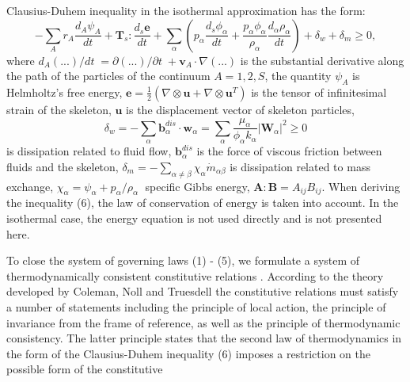 \documentclass[article,authoryear,jpm]{beg_39}             %
\begin{document}
Clausius-Duhem inequality in the isothermal approximation has the form:
\begin{equation}
-\sum\limits_{A}{{{r}_{A}}\frac{{{d}_{A}}{{\psi }_{A}}}{dt}}+{{\mathbf{T}}_{s}}:\frac{{{d}_{s}}\mathbf{e}}{dt}+\sum\limits_{\alpha }{\left( {{p}_{\alpha }}\frac{{{d}_{s}}{{\phi }_{\alpha }}}{dt}+\frac{{{p}_{\alpha }}{{\phi }_{\alpha }}}{{{\rho }_{\alpha }}}\frac{{{d}_{\alpha }}{{\rho }_{\alpha }}}{dt} \right)}+{{\delta }_{w}}+{{\delta }_{m}}\ge 0,
\end{equation}
where ${{{d}_{A}}\left( ... \right)}/{dt}\;={\partial \left( ... \right)}/{\partial t}\;+{{\mathbf{v}}_{A}}\cdot \nabla (...)$ is the substantial derivative along the path of the particles of the continuum $A=1,2,S$, the quantity ${{\psi }_{A}}$ is Helmholtz’s free energy, $\mathbf{e}=\frac{1}{2}\left( \nabla \otimes \mathbf{u}+\nabla \otimes {{\mathbf{u}}^{T}} \right)$ is the tensor of infinitesimal strain of the skeleton, $\mathbf{u}$ is the displacement vector of skeleton particles, $${{\delta }_{w}}=-\sum\limits_{\alpha }{\mathbf{b}_{\alpha }^{dis}}\cdot {{\mathbf{w}}_{\alpha }}=\sum\limits_{\alpha }{\frac{{{\mu }_{\alpha }}}{{{\phi }_{\alpha }}{{k}_{\alpha }}}{{\left| {{\mathbf{W}}_{\alpha }} \right|}^{2}}}\ge 0$$ is dissipation related to fluid flow, $\mathbf{b}_{\alpha }^{dis}$ is the force of viscous friction between fluids and the skeleton, ${{\delta }_{m}}=-\sum\limits_{\alpha \ne \beta }{{{\chi }_{\alpha }}{{{\dot{m}}}_{\alpha \beta }}}$ is dissipation related to mass exchange, ${{\chi }_{\alpha }}={{\psi }_{\alpha }}+{{{p}_{\alpha }}}/{{{\rho }_{\alpha }}}\;$ specific Gibbs energy, $\mathbf{A}:\mathbf{B}={{A}_{ij}}{{B}_{ij}}$. When deriving the inequality (6), the law of conservation of energy is taken into account. In the isothermal case, the energy equation is not used directly and is not presented here.

To close the system of governing laws (1) - (5), we formulate a system of thermodynamically consistent constitutive relations \cite{Truesdell}. According to the theory developed by Coleman, Noll and Truesdell the constitutive relations must satisfy a number of statements including the principle of local action, the principle of invariance from the frame of reference, as well as the principle of thermodynamic consistency. The latter principle states that the second law of thermodynamics in the form of the Clausius-Duhem inequality (6) imposes a restriction on the possible form of the constitutive
\end{document}
